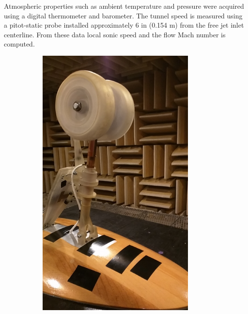 Atmospheric properties such as ambient temperature and pressure were acquired using a digital thermometer and barometer. The tunnel speed is measured using a pitot-static probe installed approximately 6 in (0.154 m) from the free jet inlet centerline. From these data local sonic speed and the flow Mach number is computed.

\begin{figure}
\begin{center}
\begin{subfigure}{0.45\textwidth}
\includegraphics[width=\linewidth]{figures/model1a}

\end{subfigure}
\end{center}
\end{figure}
